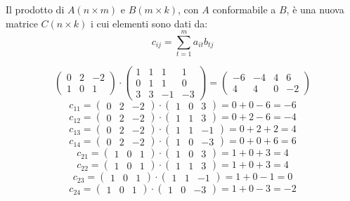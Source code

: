 \begin{definition}
  Il prodotto di $A\left( n\times m \right)$ e $B\left( m\times k \right)$, con $A$ conformabile a $B$, è una nuova matrice $C\left( n\times k \right)$ i cui elementi sono dati da:
  $$c_{ij}=\sum_{t=1}^ma_{it}b_{tj}$$
\end{definition}
\begin{example}
  $$
    \begin{pmatrix}
      0 & 2 & -2 \\
      1 & 0 & 1  
    \end{pmatrix}
    \cdot
    \begin{pmatrix}
      1 & 1 & 1  & 1  \\
      0 & 1 & 1  & 0  \\
      3 & 3 & -1 & -3 
    \end{pmatrix}
    =
    \begin{pmatrix}
      -6 & -4 & 4 & 6  \\
      4  & 4  & 0 & -2 
    \end{pmatrix}
  $$
  $$c_{11}=\begin{pmatrix}0&2&-2\end{pmatrix}\cdot\begin{pmatrix}1&0&3\end{pmatrix}=0+0-6=-6$$
  $$c_{12}=\begin{pmatrix}0&2&-2\end{pmatrix}\cdot\begin{pmatrix}1&1&3\end{pmatrix}=0+2-6=-4$$
  $$c_{13}=\begin{pmatrix}0&2&-2\end{pmatrix}\cdot\begin{pmatrix}1&1&-1\end{pmatrix}=0+2+2=4$$
  $$c_{14}=\begin{pmatrix}0&2&-2\end{pmatrix}\cdot\begin{pmatrix}1&0&-3\end{pmatrix}=0+0+6=6$$
  $$c_{21}=\begin{pmatrix}1&0&1\end{pmatrix}\cdot\begin{pmatrix}1&0&3\end{pmatrix}=1+0+3=4$$
  $$c_{22}=\begin{pmatrix}1&0&1\end{pmatrix}\cdot\begin{pmatrix}1&1&3\end{pmatrix}=1+0+3=4$$
  $$c_{23}=\begin{pmatrix}1&0&1\end{pmatrix}\cdot\begin{pmatrix}1&1&-1\end{pmatrix}=1+0-1=0$$
  $$c_{24}=\begin{pmatrix}1&0&1\end{pmatrix}\cdot\begin{pmatrix}1&0&-3\end{pmatrix}=1+0-3=-2$$
\end{example}

